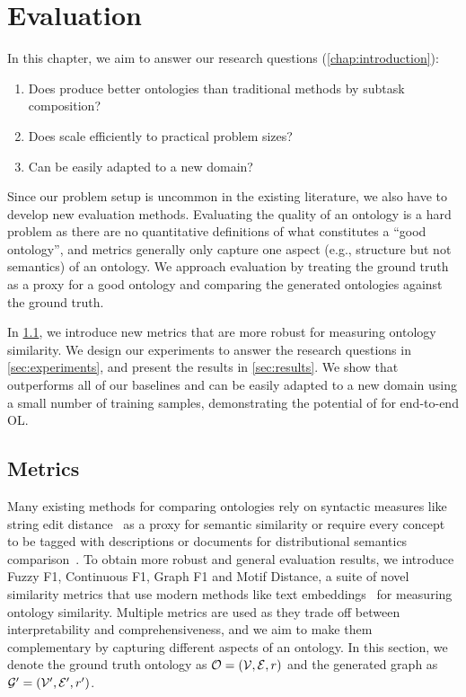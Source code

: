 \chapter{Evaluation}  \label{chap:evaluation}

In this chapter, we aim to answer our research questions (\cref{chap:introduction}):
\begin{enumerate}
    \item Does \name produce better ontologies than traditional methods by subtask composition?
    \item Does \name scale efficiently to practical problem sizes?
    \item Can \name be easily adapted to a new domain?
\end{enumerate}
Since our problem setup is uncommon in the existing literature, we also have to develop new evaluation methods. Evaluating the quality of an ontology is a hard problem as there are no quantitative definitions of what constitutes a ``good ontology'', and metrics generally only capture one aspect (e.g., structure but not semantics) of an ontology. We approach evaluation by treating the ground truth as a proxy for a good ontology and comparing the generated ontologies against the ground truth.

In \cref{sec:metrics}, we introduce new metrics that are more robust for measuring ontology similarity. We design our experiments to answer the research questions in \cref{sec:experiments}, and present the results in \cref{sec:results}. We show that \name outperforms all of our baselines and can be easily adapted to a new domain using a small number of training samples, demonstrating the potential of \name for end-to-end OL.

\section{Metrics}  \label{sec:metrics}

Many existing methods for comparing ontologies rely on syntactic measures like string edit distance~\cite{Ehrig2005SimilarityFO} as a proxy for semantic similarity or require every concept to be tagged with descriptions or documents for distributional semantics comparison~\cite{Zavitsanos2011GoldSE}. To obtain more robust and general evaluation results, we introduce Fuzzy F1, Continuous F1, Graph F1 and Motif Distance, a suite of novel similarity metrics that use modern methods like text embeddings~\cite{reimers-2019-sentence-bert} for measuring ontology similarity. Multiple metrics are used as they trade off between interpretability and comprehensiveness, and we aim to make them complementary by capturing different aspects of an ontology. In this section, we denote the ground truth ontology as $\mathcal{O} = (\mathcal{V}, \mathcal{E}, r)$ and the generated graph as $\mathcal{G}' = (\mathcal{V}', \mathcal{E}', r')$.

